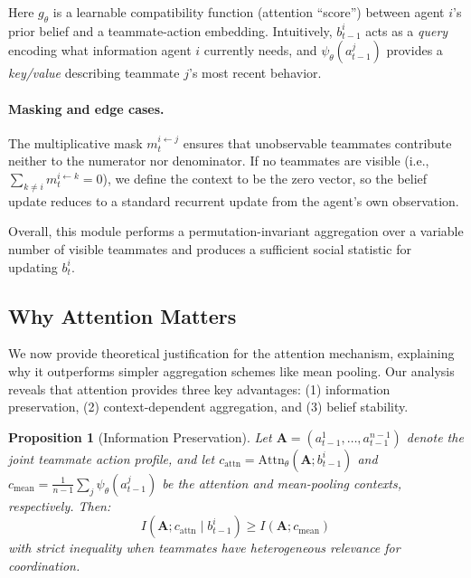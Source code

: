 \documentclass{article}
\theoremstyle{plain}
\newtheorem{proposition}[theorem]{Proposition}
\theoremstyle{definition}
\theoremstyle{remark}
\begin{document}
Here $g_\theta$ is a learnable compatibility function (attention ``score'') between agent $i$'s prior belief and a teammate-action embedding. Intuitively, $b_{t-1}^i$ acts as a \emph{query} encoding what information agent $i$ currently needs, and $\psi_\theta(a_{t-1}^j)$ provides a \emph{key/value} describing teammate $j$'s most recent behavior.

\paragraph{Masking and edge cases.}
The multiplicative mask $m_t^{i\leftarrow j}$ ensures that unobservable teammates contribute neither to the numerator nor denominator. If no teammates are visible (i.e., $\sum_{k\neq i} m_t^{i\leftarrow k}=0$), we define the context to be the zero vector, so the belief update reduces to a standard recurrent update from the agent's own observation.

Overall, this module performs a permutation-invariant aggregation over a variable number of visible teammates and produces a sufficient social statistic for updating $b_t^i$.

\subsection{Why Attention Matters}
\label{sec:theory_attention}

We now provide theoretical justification for the attention mechanism, explaining why it outperforms simpler aggregation schemes like mean pooling. Our analysis reveals that attention provides three key advantages: (1) information preservation, (2) context-dependent aggregation, and (3) belief stability.

\begin{proposition}[Information Preservation]
\label{prop:info_preservation}
Let $\mathbf{A} = (a_{t-1}^1, \ldots, a_{t-1}^{n-1})$ denote the joint teammate action profile, and let $c_{\mathrm{attn}} = \mathrm{Attn}_\theta(\mathbf{A}; b_{t-1}^i)$ and $c_{\mathrm{mean}} = \frac{1}{n-1}\sum_j \psi_\theta(a_{t-1}^j)$ be the attention and mean-pooling contexts, respectively. Then:
\begin{equation}
I(\mathbf{A}; c_{\mathrm{attn}} \mid b_{t-1}^i) \geq I(\mathbf{A}; c_{\mathrm{mean}})
\end{equation}
with strict inequality when teammates have heterogeneous relevance for coordination.
\end{proposition}
\end{document}

